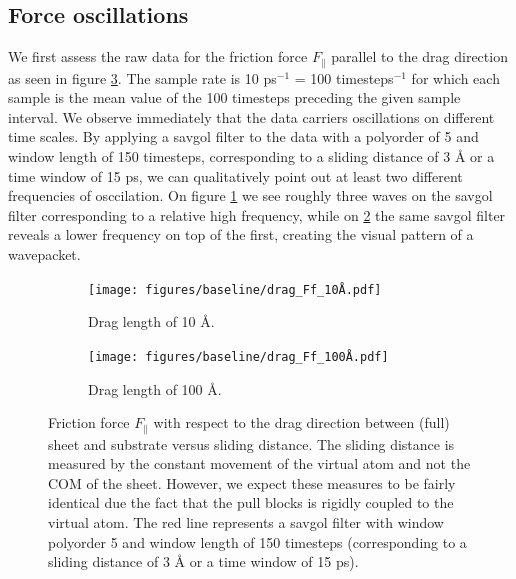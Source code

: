 \subsection{Force oscillations}\label{sec:force_oscillations}
We first assess the raw data for the friction force $F_{\parallel}$ parallel to the drag direction as seen in figure \ref{fig:drag_Ff}. The sample rate is 10 ps$^{-1}$ = 100 timesteps$^{-1}$ for which each sample is the mean value of the 100 timesteps preceding the given sample interval. We observe immediately that the data carriers oscillations on different time scales. By applying a savgol filter to the data with a polyorder of 5 and window length of 150 timesteps, corresponding to a sliding distance of 3 Å or a time window of 15 ps, we can qualitatively point out at least two different frequencies of osccilation. On figure \ref{fig:drag_Ff_10} we see roughly three waves on the savgol filter corresponding to a relative high frequency, while on \ref{fig:drag_Ff_100} the same savgol filter reveals a lower frequency on top of the first, creating the visual pattern of a wavepacket.

\begin{figure}[H]
  \centering
  \begin{subfigure}[t]{0.49\textwidth}
      \centering
      \texttt{[image: figures/baseline/drag\_Ff\_10Å.pdf]}
      \caption{Drag length of 10 Å.}
      \label{fig:drag_Ff_10}
  \end{subfigure}
  \hfill
  \begin{subfigure}[t]{0.49\textwidth}
      \centering
      \texttt{[image: figures/baseline/drag\_Ff\_100Å.pdf]}
      \caption{Drag length of 100 Å.}
      \label{fig:drag_Ff_100}
  \end{subfigure}
  \hfill
     \caption{Friction force $F_\parallel$ with respect to the drag direction between (full) sheet and substrate versus sliding distance. The sliding distance is measured by the constant movement of the virtual atom and not the COM of the sheet. However, we expect these measures to be fairly identical due the fact that the pull blocks is rigidly coupled to the virtual atom. The red line represents a savgol filter with window polyorder 5 and window length of 150 timesteps (corresponding to a sliding distance of 3 Å or a time window of 15 ps).}
     \label{fig:drag_Ff}
\end{figure}

